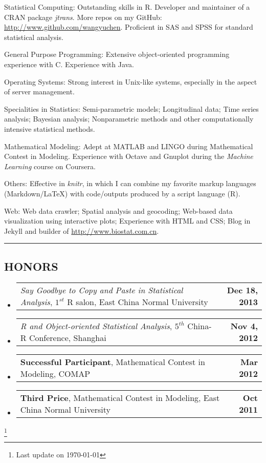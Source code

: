 \documentclass[10pt]{article}
\makeatletter
\newenvironment{unindentsection}[1]%
{\begin{list}{}%
	{\setlength{\leftmargin}{-0.5#1}}%
	\item[]%
}
{\end{list}}
\newcommand{\headerrow}[2]
{\begin{tabular*}{\linewidth}{l@{\extracolsep{\fill}}r}
	#1 &
	#2 \\
\end{tabular*}}
\newcommand{\CPP}
{C\nolinebreak[4]\hspace{-.05em}\raisebox{.22ex}{\footnotesize\bf ++}}
\makeatother
\begin{document}
\begin{description*}
	\item[Statistical Computing:] Outstanding skills in R. Developer and maintainer of a CRAN package \emph{jtrans}. More repos on my GitHub: \url{http://www.github.com/wangyuchen}. Proficient in SAS and SPSS for standard statistical analysis.
	\item[General Purpose Programming:] Extensive object-oriented programming experience with \CPP. Experience with Java.
	\item[Operating Systems:] Strong interest in Unix-like systems, especially in the aspect of server management.
	\item[Specialities in Statistics:] Semi-parametric models; Longitudinal data; Time series analysis; Bayesian analysis; Nonparametric methods and other computationally intensive statistical methods.
	\item[Mathematical Modeling:] Adept at MATLAB and LINGO during Mathematical Contest in Modeling. Experience with Octave and Gnuplot during the \emph{Machine Learning} course on Coursera.
	\item[Others:] Effective in \emph{knitr}, in which I can combine my favorite markup languages (Markdown/\LaTeX) with code/outputs produced by a script language (R).
	\item[Web:] Web data crawler; Spatial analysis and geocoding; Web-based data visualization using interactive plots; Experience with HTML and CSS; Blog in Jekyll and builder of \url{http://www.biostat.com.cn}. 
\end{description*}


\vspace{0.2em}
\hrule
\vspace{-1em}

\subsection*{\centering HONORS}

\begin{unindentsection}{\parindent}
	\begin{itemize}
		\item
		\headerrow
			{\emph{Say Goodbye to Copy and Paste in Statistical Analysis}, $1^{st}$ R salon, East China Normal University}
			{\textbf{Dec 18, 2013}}
		\item 
		\headerrow
			{\emph{R and Object-oriented Statistical Analysis}, $5^{th}$ China-R Conference, Shanghai}
			{\textbf{Nov 4, 2012}}
		\item 
		\headerrow
			{\textbf{Successful Participant}, Mathematical Contest in Modeling, COMAP}
			{\textbf{Mar 2012}}
		\item
		\headerrow
			{\textbf{Third Price}, Mathematical Contest in Modeling, East China Normal University}
			{\textbf{Oct 2011}}
		
	\end{itemize}
\end{unindentsection}
\let\thefootnote\relax\footnote{Last update on \today}
\end{document}
